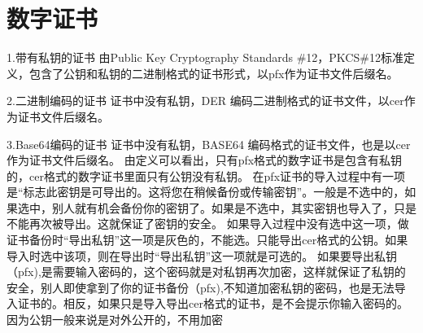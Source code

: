 \section{数字证书}
1.带有私钥的证书
由Public Key Cryptography Standards \#12，PKCS\#12标准定义，包含了公钥和私钥的二进制格式的证书形式，以pfx作为证书文件后缀名。

2.二进制编码的证书
证书中没有私钥，DER 编码二进制格式的证书文件，以cer作为证书文件后缀名。

3.Base64编码的证书
证书中没有私钥，BASE64 编码格式的证书文件，也是以cer作为证书文件后缀名。
由定义可以看出，只有pfx格式的数字证书是包含有私钥的，cer格式的数字证书里面只有公钥没有私钥。
在pfx证书的导入过程中有一项是“标志此密钥是可导出的。这将您在稍候备份或传输密钥”。一般是不选中的，如果选中，别人就有机会备份你的密钥了。如果是不选中，其实密钥也导入了，只是不能再次被导出。这就保证了密钥的安全。
如果导入过程中没有选中这一项，做证书备份时“导出私钥”这一项是灰色的，不能选。只能导出cer格式的公钥。如果导入时选中该项，则在导出时“导出私钥”这一项就是可选的。
如果要导出私钥（pfx),是需要输入密码的，这个密码就是对私钥再次加密，这样就保证了私钥的安全，别人即使拿到了你的证书备份（pfx),不知道加密私钥的密码，也是无法导入证书的。相反，如果只是导入导出cer格式的证书，是不会提示你输入密码的。因为公钥一般来说是对外公开的，不用加密
